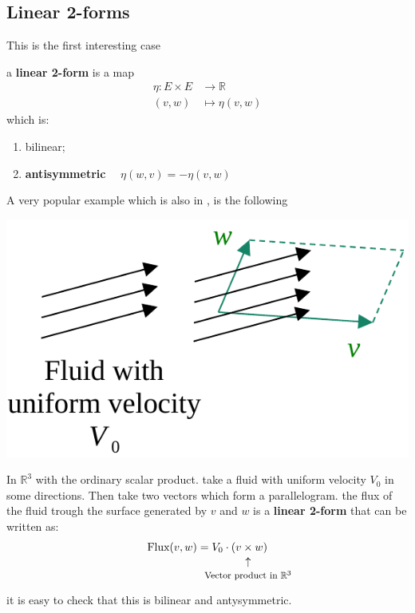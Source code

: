 \documentclass[../main.tex]{subfiles}
\begin{document}
\subsection{Linear 2-forms}
This is the first interesting case
\begin{definition}
a \textbf{linear 2-form} is a map
\[
\begin{split}
\eta : E\times E& \to  \mathbb{R}\\
(v,w) &\mapsto \eta(v,w)
\end{split}
\]
which is:
\begin{enumerate}
    \item bilinear;
    \item \textbf{antisymmetric} \(\quad \eta(w,v)=-\eta(v,w)\)
\end{enumerate}
\end{definition}
A very popular example which is also in , is the following
\begin{marginfigure}[8mm]
	\includegraphics[width=1.1\linewidth]{images/fluid_as_linear_2form.pdf}
	\caption[Flux of a fluid as 2-form]{}
\end{marginfigure} 
\begin{example}
In $\mathbb{R}^3$ with the ordinary scalar product. take a fluid with uniform velocity $V_0$ in some directions. Then take two vectors which form a parallelogram. the flux of the fluid trough the surface generated by $v$ and $w$ is a \textbf{linear 2-form} that can be written as:
\[
\textrm{Flux}(v,w)=V_0\cdot(v\underset{\mathclap{\tikz \node {$\uparrow$} node [below=1ex] {\footnotesize Vector product in $\mathbb{R}^3$};}}{\times} w)
\]
it is easy to check that this is bilinear and antysymmetric.
\end{example}
\end{document}
